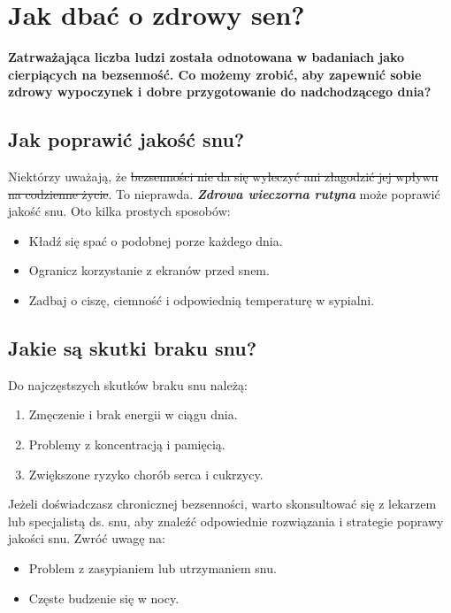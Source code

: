 \documentclass[12pt,a4paper]{article}
\begin{document}
\section*{Jak dbać o zdrowy sen?}

\textbf{Zatrważająca liczba ludzi została odnotowana w badaniach jako cierpiących na bezsenność. Co możemy zrobić, aby zapewnić sobie zdrowy wypoczynek i dobre przygotowanie do nadchodzącego dnia?}

\subsection*{Jak poprawić jakość snu?}

Niektórzy uważają, że \sout{bezsenności nie da się wyleczyć ani złagodzić jej wpływu na codzienne życie}. To nieprawda. \textbf{\textit{Zdrowa wieczorna rutyna}} może poprawić jakość snu. Oto kilka prostych sposobów:

\begin{itemize}
    \item Kładź się spać o podobnej porze każdego dnia.
    \item Ogranicz korzystanie z ekranów przed snem.
    \item Zadbaj o ciszę, ciemność i odpowiednią temperaturę w sypialni.
\end{itemize}

\subsection*{Jakie są skutki braku snu?}

Do najczęstszych skutków braku snu należą:

\begin{enumerate}
    \item Zmęczenie i brak energii w ciągu dnia.
    \item Problemy z koncentracją i pamięcią.
    \item Zwiększone ryzyko chorób serca i cukrzycy.
\end{enumerate}

Jeżeli doświadczasz chronicznej bezsenności, warto skonsultować się z lekarzem lub specjalistą ds. snu, aby znaleźć odpowiednie rozwiązania i strategie poprawy jakości snu. Zwróć uwagę na:

\begin{itemize}
    \item[$\square$] Problem z zasypianiem lub utrzymaniem snu.
    \item[$\square$] Częste budzenie się w nocy.
\end{itemize}
\end{document}
